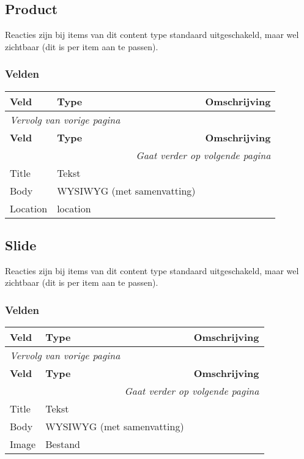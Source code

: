 \subsection{Product}
\label{sec:content-product}
Reacties zijn bij items van dit content type standaard uitgeschakeld, maar wel zichtbaar (dit is per item aan te passen).

\subsubsection{Velden}
  \begin{longtable}{| p{3.75cm}|p{3.75cm}|p{7.50cm}|}
  \hline
  \rowcolor{tableheader}
  \textbf{Veld} & \textbf{Type} & \textbf{Omschrijving}  \tabularnewline
  \hline
\endfirsthead
\multicolumn{3}{l}{\textit{Vervolg van vorige pagina}} \\
\hline
\rowcolor{tableheader}
  \textbf{Veld} & \textbf{Type} & \textbf{Omschrijving}  \tabularnewline
  \hline
\hline
\endhead
\multicolumn{3}{r}{\textit{Gaat verder op volgende pagina}} \\
\endfoot
\hline
\endlastfoot
  \raggedright{Title} & \raggedright{Tekst} & \raggedright{}  \tabularnewline
  \hline
  \raggedright{Body} & \raggedright{WYSIWYG (met samenvatting)} & \raggedright{}  \tabularnewline
  \hline
  \raggedright{Location} & \raggedright{location} & \raggedright{}  \tabularnewline
  \hline
  \end{longtable}

\subsection{Slide}
\label{sec:content-slide}
Reacties zijn bij items van dit content type standaard uitgeschakeld, maar wel zichtbaar (dit is per item aan te passen).

\subsubsection{Velden}
  \begin{longtable}{| p{3.75cm}|p{3.75cm}|p{7.50cm}|}
  \hline
  \rowcolor{tableheader}
  \textbf{Veld} & \textbf{Type} & \textbf{Omschrijving}  \tabularnewline
  \hline
\endfirsthead
\multicolumn{3}{l}{\textit{Vervolg van vorige pagina}} \\
\hline
\rowcolor{tableheader}
  \textbf{Veld} & \textbf{Type} & \textbf{Omschrijving}  \tabularnewline
  \hline
\hline
\endhead
\multicolumn{3}{r}{\textit{Gaat verder op volgende pagina}} \\
\endfoot
\hline
\endlastfoot
  \raggedright{Title} & \raggedright{Tekst} & \raggedright{}  \tabularnewline
  \hline
  \raggedright{Body} & \raggedright{WYSIWYG (met samenvatting)} & \raggedright{}  \tabularnewline
  \hline
  \raggedright{Image} & \raggedright{Bestand} & \raggedright{}  \tabularnewline
  \hline
  \end{longtable}

